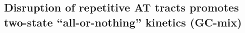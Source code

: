 \documentclass[journal=jpcbfk,manuscript=article]{achemso}
\begin{document}




\subsection{Disruption of repetitive AT tracts promotes two-state ``all-or-nothing'' kinetics (GC-mix)}
\end{document}
